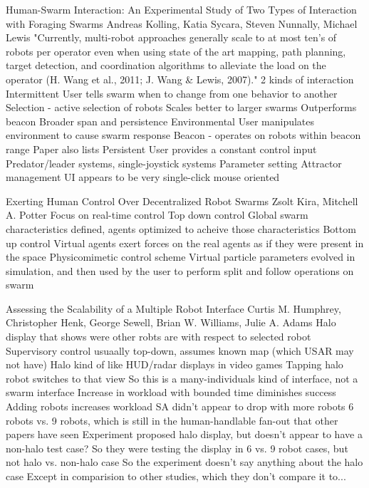 \citep{kolling2013human}
Human-Swarm Interaction: An Experimental Study of Two Types of Interaction with Foraging Swarms
Andreas Kolling, Katia Sycara, Steven Nunnally, Michael Lewis
	"Currently, multi-robot approaches generally scale to at most ten’s of robots per operator even when using state of the art mapping, path planning, target detection, and coordination algorithms to alleviate the load on the operator (H. Wang et al., 2011; J. Wang \& Lewis, 2007)."
	2 kinds of interaction
		Intermittent
			User tells swarm when to change from one behavior to another
			Selection - active selection of robots
				Scales better to larger swarms
				Outperforms beacon
					Broader span and persistence
		Environmental
			User manipulates environment to cause swarm response
			Beacon - operates on robots within beacon range
	Paper also lists
		Persistent
			User provides a constant control input
				Predator/leader systems, single-joystick systems
		Parameter setting
			Attractor management
	UI appears to be very single-click mouse oriented



\citep{kira2009exerting}
Exerting Human Control Over Decentralized Robot Swarms
Zsolt Kira, Mitchell A. Potter
	Focus on real-time control
	Top down control
		Global swarm characteristics defined, agents optimized to acheive those characteristics
	Bottom up control
		Virtual agents exert forces on the real agents as if they were present in the space
	Physicomimetic control scheme
	Virtual particle parameters evolved in simulation, and then used by the user to perform split and follow operations on swarm

\citep{humphrey2007assessing}
Assessing the Scalability of a Multiple Robot Interface
Curtis M. Humphrey, Christopher Henk, George Sewell, Brian W. Williams, Julie A. Adams
	Halo display that shows were other robts are with respect to selected robot
	Supervisory control usuaally top-down, assumes known map (which USAR may not have)
	Halo kind of like HUD/radar displays in video games
	Tapping halo robot switches to that view
		So this is a many-individuals kind of interface, not a swarm interface
	Increase in workload with bounded time diminishes success
		Adding robots increases workload
	SA didn't appear to drop with more robots
		6 robots vs. 9 robots, which is still in the human-handlable fan-out that other papers have seen
	Experiment proposed halo display, but doesn't appear to have a non-halo test case?
		So they were testing the display in 6 vs. 9 robot cases, but not halo vs. non-halo case
		So the experiment doesn't say anything about the halo case
			Except in comparision to other studies, which they don't compare it to...

